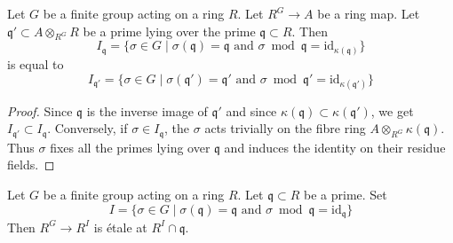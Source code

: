 \begin{lemma}
\label{lemma-inertia-base-change}
Let $G$ be a finite group acting on a ring $R$. Let $R^G \to A$ be a ring
map. Let $\mathfrak q' \subset A \otimes_{R^G} R$ be a prime lying
over the prime $\mathfrak q \subset R$. Then
$$
I_\mathfrak q = \{\sigma \in G \mid
\sigma(\mathfrak q) = \mathfrak q\text{ and }
\sigma \bmod \mathfrak q = \text{id}_{\kappa(\mathfrak q)}\}
$$
is equal to
$$
I_{\mathfrak q'} = \{\sigma \in G \mid
\sigma(\mathfrak q') = \mathfrak q'\text{ and }
\sigma \bmod \mathfrak q' = \text{id}_{\kappa(\mathfrak q')}\}
$$
\end{lemma}

\begin{proof}
Since $\mathfrak q$ is the inverse image of $\mathfrak q'$
and since $\kappa(\mathfrak q) \subset \kappa(\mathfrak q')$,
we get $I_{\mathfrak q'} \subset I_\mathfrak q$.
Conversely, if $\sigma \in I_\mathfrak q$, the $\sigma$
acts trivially on the fibre ring $A \otimes_{R^G} \kappa(\mathfrak q)$.
Thus $\sigma$ fixes all the primes lying over $\mathfrak q$
and induces the identity on their residue fields.
\end{proof}

\begin{lemma}
\label{lemma-inertia-invariants-etale}
Let $G$ be a finite group acting on a ring $R$. Let $\mathfrak q \subset R$
be a prime. Set
$$
I = \{\sigma \in G \mid \sigma(\mathfrak q) = \mathfrak q
\text{ and } \sigma \bmod \mathfrak q = \text{id}_\mathfrak q\}
$$
Then $R^G \to R^I$ is \'etale at $R^I \cap \mathfrak q$.
\end{lemma}

